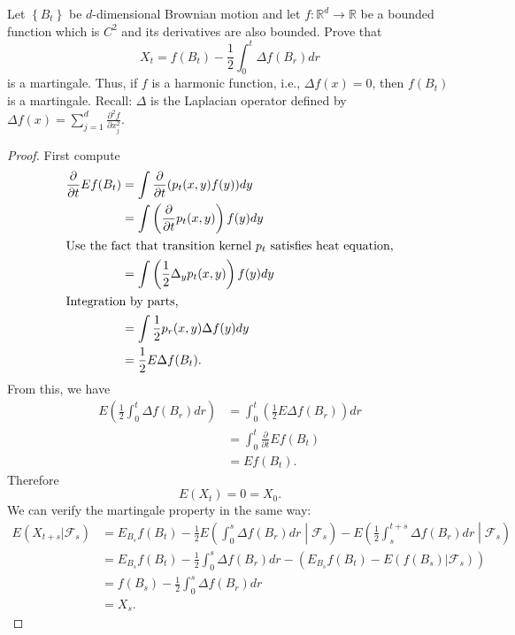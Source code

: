 \begin{problem}
Let $\left\{B_t\right\}$ be $d$-dimensional Brownian motion and let $f: \mathbb{R}^d \rightarrow \mathbb{R}$ be a bounded function which is $C^2$ and its derivatives are also bounded. Prove that
\[
X_t=f\left(B_t\right)-\frac{1}{2} \int_0^t \Delta f\left(B_r\right) d r
\]
is a martingale. Thus, if $f$ is a harmonic function, i.e., $\Delta f(x)=0$, then $f\left(B_t\right)$ is a martingale. Recall: $\Delta$ is the Laplacian operator defined by $\Delta f(x)=\sum_{j=1}^d \frac{\partial^2 f}{\partial x_j^2}$.
\end{problem}
\begin{proof}
	First compute
	\begin{align*}
		\frac{\partial }{\partial t} E f(B_t)
		&= \int \frac{\partial }{\partial t} (p_t(x,y) f(y)) dy \\
		&= \int \left( \frac{\partial }{\partial t} p_t(x,y) \right) f(y) dy \\
		\intertext{Use the fact that transition kernel $p_t$ satisfies heat equation,}
		&= \int \left( \frac{1}{2} \Delta_y p_t(x,y) \right) f(y) dy \\
		\intertext{Integration by parts,}
		&= \int \frac{1}{2} p_r (x,y) \Delta f(y) dy \\
		&= \frac{1}{2} E \Delta f(B_t) 
	.\end{align*} 
	From this, we have
	\begin{align*}
		E\left( \frac{1}{2} \int _0^t \Delta f(B_r) dr \right) 
		&= \int _0^t \left( \frac{1}{2 } E \Delta f (B_r)  \right) dr \\
		&= \int _0^t \frac{\partial }{\partial t} Ef(B_t) \\
		&= E f(B_t)
	.\end{align*}
	Therefore
	\[
		E(X_t) = 0 = X_0
	.\] 
	We can verify the martingale property in the same way:
	\begin{align*}
		E(X_{t + s} | \mathcal{F}_s)
		&= E_{B_s} f(B_t) - \frac{1}{2} E \left(\int _0^{s} \Delta f(B_r) dr \middle| \mathcal{F}_s\right)- E\left(\frac{1}{2} \int _s^{t + s} \Delta f(B_r) dr \middle| \mathcal{F}_s \right)\\
		&= E_{B_s} f(B_t) - \frac{1}{2} \int _0^{s} \Delta f(B_r) dr - \left( E_{B_s} f(B_{t}) - E (f(B_s)| \mathcal{F}_s) \right) \\
		&= f(B_s) -  \frac{1}{2} \int _0^{s} \Delta f(B_r) dr \\
		&= X_{s}
	.\end{align*}
\end{proof}

